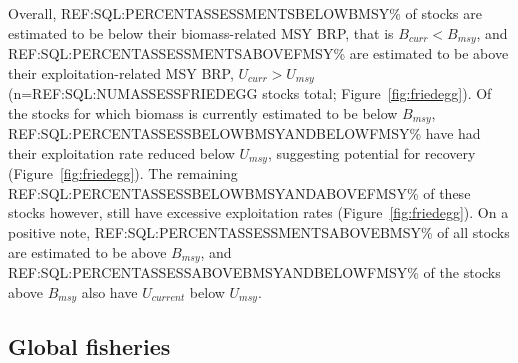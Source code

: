 Overall, REF:SQL:PERCENTASSESSMENTSBELOWBMSY\% of stocks are estimated
to be below their biomass-related MSY BRP, that is $B_{curr}<B_{msy}$,
and REF:SQL:PERCENTASSESSMENTSABOVEFMSY\% are estimated to be above
their exploitation-related MSY BRP, $U_{curr}>U_{msy}$
(n=REF:SQL:NUMASSESSFRIEDEGG stocks total; Figure~\ref{fig:friedegg}).
Of the stocks for which biomass is currently estimated to be below
$B_{msy}$, REF:SQL:PERCENTASSESSBELOWBMSYANDBELOWFMSY\% have had their
exploitation rate reduced below $U_{msy}$, suggesting potential for
recovery (Figure~\ref{fig:friedegg}). The remaining
REF:SQL:PERCENTASSESSBELOWBMSYANDABOVEFMSY\% of these stocks however,
still have excessive exploitation rates
(Figure~\ref{fig:friedegg}). On a positive note,
REF:SQL:PERCENTASSESSMENTSABOVEBMSY\% of all stocks are estimated to
be above $B_{msy}$, and REF:SQL:PERCENTASSESSABOVEBMSYANDBELOWFMSY\%
of the stocks above $B_{msy}$ also have $U_{current}$ below $U_{msy}$.


\subsection*{Global fisheries}

